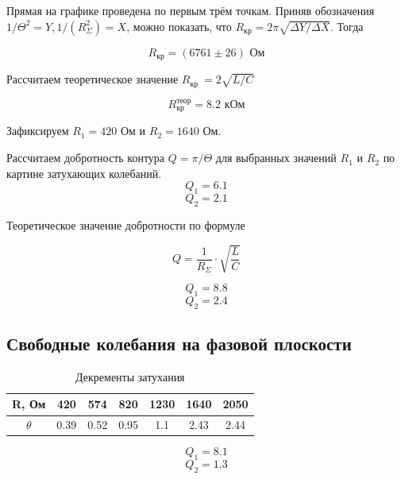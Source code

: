 \documentclass[a4paper,12 pt]{article}
\begin{document}
Прямая на графике проведена по первым трём точкам. Приняв обозначения $1 / \Theta^2=Y, 1 /\left(R_{\Sigma}^2\right)=X$, можно показать, что $R_{\mathrm{кр}}=2 \pi \sqrt{\Delta Y / \Delta X}$. Тогда 

\[R_{\text{кр}} = (6761 \pm 26) \text{ Ом}\]

Рассчитаем теоретическое значение $R_{\text {кр }}=2 \sqrt{L / C}$

\[R_{\text{кр}}^{\text{теор}} = 8.2 \text{ кОм}\]

Зафиксируем $R_1 = 420$ Ом и $R_2 = 1640$ Ом.

Рассчитаем добротность контура $Q=\pi / \Theta$ для выбранных значений $R_1$ и $R_2$ по картине затухающих колебаний.
\[Q_1 = 6.1\]
\[Q_2 = 2.1\]

Теоретическое значение добротности по формуле

\[Q = \frac{1}{R_{\Sigma}} \cdot \sqrt{\frac{L}{C}}\]

\[Q_1 = 8.8\]
\[Q_2 = 2.4\]





















\subsection{Свободные колебания на фазовой плоскости}

\begin{table}[H]
    \centering
    \begin{tabular}{|c|c|c|c|c|c|c|}
    \hline
         R, Ом & 420 & 574 & 820 & 1230 & 1640 & 2050 \\
         \hline
         $\theta$ & 0.39 & 0.52 & 0.95 & 1.1 & 2.43 & 2.44 \\
         \hline
    \end{tabular}
    \caption{Декременты затухания}
\end{table}

\[Q_1 = 8.1\]
\[Q_2 = 1.3\]
\end{document}

